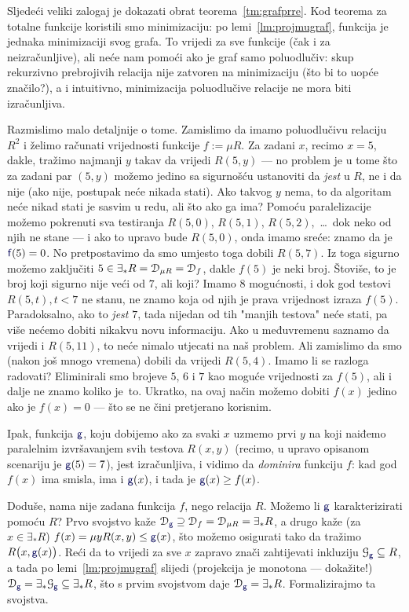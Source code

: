 Sljedeći veliki zalogaj je dokazati obrat teorema~\ref{tm:grafprre}. Kod teorema za totalne funkcije koristili smo minimizaciju: po lemi~\ref{lm:projmugraf}, funkcija je jednaka minimizaciji svog grafa. To vrijedi za sve funkcije (čak i za neizračunljive), ali neće nam pomoći ako je graf samo poluodlučiv: skup rekurzivno prebrojivih relacija nije zatvoren na minimizaciju (što bi to uopće značilo?), a i intuitivno, minimizacija poluodlučive relacije ne mora biti izračunljiva.

Razmislimo malo detaljnije o tome. Zamislimo da imamo poluodlučivu relaciju $R^2$ i želimo računati vrijednosti funkcije $f:=\mu R$. Za zadani $x$, recimo $x=5$, dakle, tražimo najmanji $y$ takav da vrijedi $R(5,y)$ --- no problem je u tome što za zadani par $(5,y)$ možemo jedino sa sigurnošću ustanoviti da \emph{jest} u $R$, ne i da nije (ako nije, postupak neće nikada stati). Ako takvog $y$ nema, to da algoritam neće nikad stati je sasvim u redu, ali što ako ga ima? Pomoću paralelizacije možemo pokrenuti sva testiranja $R(5,0)$, $R(5,1)$, $R(5,2)$,~\ldots\ dok neko od njih ne stane --- i ako to upravo bude $R(5,0)$, onda imamo sreće: znamo da je $\f f(5)=0$. No pretpostavimo da smo umjesto toga dobili $R(5,7)$. Iz toga sigurno možemo zaključiti $5\in\exists_*R=\mathcal D_{\mu R}=\mathcal D_{f}$, dakle $f(5)$ je neki broj. Štoviše, to je broj koji sigurno nije veći od $7$, ali koji? Imamo $8$ mogućnosti, i dok god testovi $R(5,t),t<7$ ne stanu, ne znamo koja od njih je prava vrijednost izraza $f(5)$. Paradoksalno, ako to \emph{jest} $7$, tada nijedan od tih "manjih testova" neće stati, pa više nećemo dobiti nikakvu novu informaciju. Ako u međuvremenu saznamo da vrijedi i $R(5,11)$, to neće nimalo utjecati na naš problem. Ali zamislimo da smo (nakon još mnogo vremena) dobili da vrijedi $R(5,4)$. Imamo li se razloga radovati? Eliminirali smo brojeve $5$, $6$ i $7$ kao moguće vrijednosti za $f(5)$, ali i dalje ne znamo koliko je~to. Ukratko, na ovaj način možemo dobiti $f(x)$ jedino ako je $f(x)=0$ --- što se ne čini pretjerano korisnim.

Ipak, funkcija $\f g$, koju dobijemo ako za svaki $x$ uzmemo prvi $y$ na koji naiđemo paralelnim izvršavanjem svih testova $R(x,y)$ (recimo, u upravo opisanom scenariju je $\f g(5)=7$), jest izračunljiva, i vidimo da \emph{dominira} funkciju $f$: kad god $f(x)$ ima smisla, ima i $\f g(x)$, i tada je $\f g(x)\ge f(x)$.

Doduše, nama nije zadana funkcija $f$, nego relacija $R$. Možemo li $\f g$ karakterizirati pomoću $R$? Prvo svojstvo kaže $\dom{\f g}\supseteq\dom f=\dom{\mu R}=\exists_*R$, a drugo kaže (za $x\in\exists_*R$) $f(x)=\mu yR(x,y)\le\f g(x)$, što možemo osigurati tako da tražimo $R\bigl(x,\f g(x)\bigr)$. Reći da to vrijedi za sve $x$ zapravo znači zahtijevati inkluziju $\graf{\f g}\subseteq R$, a tada po lemi~\ref{lm:projmugraf} slijedi (projekcija je monotona --- dokažite!) $\dom{\f g}=\exists_*\graf{\f g}\subseteq\exists_*R$, što s prvim svojstvom daje $\dom{\f g}=\exists_*R$. Formalizirajmo ta svojstva.


